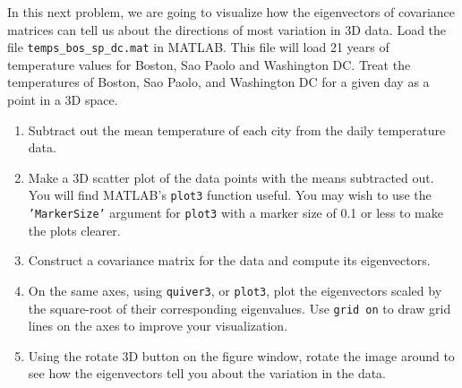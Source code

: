 \begin{prob}\label{dataCovarianceQuestion} 
In this next problem, we are going to visualize how the eigenvectors of covariance matrices can tell us about the directions of most variation in 3D data. Load the file \texttt{temps\_bos\_sp\_dc.mat} in MATLAB. This file will load 21 years of temperature values for Boston, Sao Paolo and Washington DC. Treat the temperatures of Boston, Sao Paolo, and Washington DC for a given day as a point in a 3D space.
    \begin{enumerate}
    \item Subtract out the mean temperature of each city from the daily temperature data.
    \item Make a 3D scatter plot of the data points with the means subtracted out. You will find MATLAB's \texttt{plot3} function useful. You may wish to use the \texttt{'MarkerSize'} argument for \texttt{plot3} with a marker size of 0.1 or less to make the plots clearer.
    \item Construct a covariance matrix for the data and compute its eigenvectors.
    \item On the same axes, using \texttt{quiver3}, or \texttt{plot3}, plot the eigenvectors scaled by the square-root of their corresponding eigenvalues. Use \texttt{grid on} to draw grid lines on the axes to improve your visualization.
        \item Using the rotate 3D button on the figure window, rotate the image around to see how the eigenvectors tell you about the variation in the data.
    \end{enumerate}
\end{prob}
